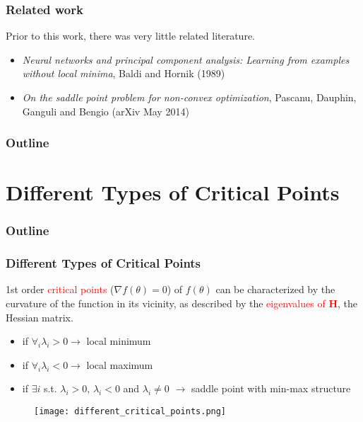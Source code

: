 \documentclass{beamer}
\begin{document}
\begin{frame}
\frametitle{Related work}
Prior to this work, there was very little related literature.
\vspace{0.25in}
\begin{itemize}
\item{\textit{Neural networks and principal component analysis: Learning from examples without local minima}, Baldi and Hornik (1989)}
\vspace{0.05in}
\item{\textit{On the saddle point problem for non-convex optimization}, Pascanu, Dauphin, Ganguli and Bengio (arXiv May 2014)}
\end{itemize}
\end{frame}

\begin{frame}
\frametitle{Outline}
\tableofcontents[pausesections]
\end{frame}

\section{Different Types of Critical Points}
\begin{frame}
\frametitle{Outline}
\tableofcontents[currentsection]
\end{frame}


\begin{frame}
\frametitle{Different Types of Critical Points}
\vspace{0.15in}
1st order \textcolor{red}{critical points} ($\nabla f(\theta) = 0$) of $f(\theta)$ can be characterized by the curvature of the function in its vicinity, as described by the \textcolor{red}{eigenvalues of $\bm{H}$}, the Hessian matrix.

\vspace{4pt}
\begin{itemize}
\pause
\item{ if $\forall_i \lambda_i > 0 \rightarrow $ local minimum}
\pause
\item{ if $\forall_i \lambda_i < 0 \rightarrow $ local maximum}
\pause
\item{ if $\exists i$ s.t. $\lambda_i > 0$, $\lambda_i <0$ and $\lambda_i \neq 0$  $\rightarrow $ saddle point with min-max structure}
\pause
\end{itemize}

\begin{figure}
\centering
\texttt{[image: different\_critical\_points.png]}
\end{figure}

\end{frame}
\end{document}
